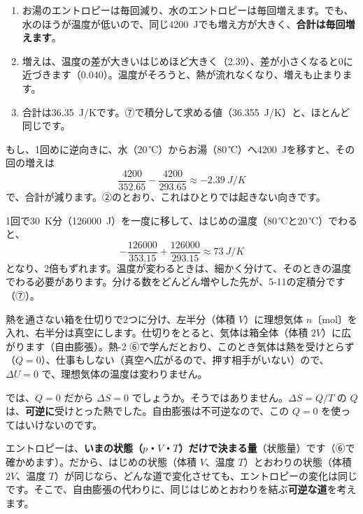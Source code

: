 \begin{enumerate}[label={\bkcircled{\arabic*}}, leftmargin=2.4\zw, itemsep=1pt, topsep=2pt]
\item お湯のエントロピーは毎回減り、水のエントロピーは毎回増えます。でも、水のほうが温度が低いので、同じ\qty{4200}{J}でも増え方が大きく、\textbf{合計は毎回増えます}。
\item 増えは、温度の差が大きいはじめほど大きく（2.39）、差が小さくなると0に近づきます（0.040）。温度がそろうと、熱が流れなくなり、増えも止まります。
\item 合計は\qty{36.35}{J/K}です。⑦で積分して求める値（\qty{36.355}{J/K}）と、ほとんど同じです。
\end{enumerate}

\begin{phmijika}
もし、1回めに逆向きに、水（20\,℃）からお湯（80\,℃）へ\qty{4200}{J}を移すと、その回の増えは
\[\frac{4200}{352.65}-\frac{4200}{293.65}\approx\qty{-2.39}{J/K}\]
で、合計が減ります。②のとおり、これはひとりでは起きない向きです。
\end{phmijika}

\begin{seikaku}
1回で\qty{30}{K}分（\qty{126000}{J}）を一度に移して、はじめの温度（80\,℃と20\,℃）でわると、
\[-\frac{126000}{353.15}+\frac{126000}{293.15}\approx\qty{73}{J/K}\]
となり、2倍もずれます。温度が変わるときは、細かく分けて、そのときの温度でわる必要があります。分ける数をどんどん増やした先が、5-11の定積分です（⑦）。
\end{seikaku}

\label{ph:熱-6:sec4}
熱を通さない箱を仕切りで2つに分け、左半分（体積 $V$）に理想気体 $n$〔mol〕を入れ、右半分は真空にします。仕切りをとると、気体は箱全体（体積 $2V$）に広がります（自由膨張）。熱-2 ⑥で学んだとおり、このとき気体は熱を受けとらず（$Q=0$）、仕事もしない（真空へ広がるので、押す相手がいない）ので、$\Delta U=0$ で、理想気体の温度は変わりません。

では、$Q=0$ だから $\Delta S=0$ でしょうか。そうではありません。$\Delta S=Q/T$ の $Q$ は、\textbf{可逆に}受けとった熱でした。自由膨張は不可逆なので、この $Q=0$ を使ってはいけないのです。

エントロピーは、\textbf{いまの状態（$p$・$V$・$T$）だけで決まる量}（状態量）です（⑥で確かめます）。だから、はじめの状態（体積 $V$、温度 $T$）とおわりの状態（体積 $2V$、温度 $T$）が同じなら、どんな道で変化させても、エントロピーの変化は同じです。そこで、自由膨張の代わりに、同じはじめとおわりを結ぶ\textbf{可逆な道}を考えます。

